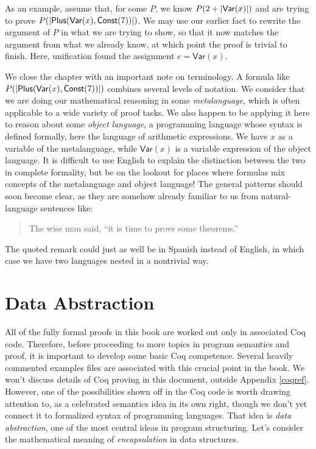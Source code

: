 \documentclass{amsbook}
\theoremstyle{definition}
\theoremstyle{remark}
\numberwithin{section}{chapter}
\numberwithin{equation}{chapter}
\begin{document}
As an example, assume that, for some $P$, we know $P(2 + {\left \lvert \mathsf{Var}(x) \right \rvert})$ and are trying to prove $P({\left \lvert \mathsf{Plus}(\mathsf{Var}(x), \mathsf{Const}(7)) \right \rvert})$.
We may use our earlier fact to rewrite the argument of $P$ in what we are trying to show, so that it now matches the argument from what we already know, at which point the proof is trivial to finish.
Here, unification found the assignment $e = \mathsf{Var}(x)$.

\medskip

\encoding
\label{metalanguage}
We close the chapter with an important note on terminology.
A formula like $P({\left \lvert \mathsf{Plus}(\mathsf{Var}(x), \mathsf{Const}(7)) \right \rvert})$ combines several levels of notation.
We consider that we are doing our mathematical reasoning in some \emph{metalanguage}, which is often applicable to a wide variety of proof tasks.
We also happen to be applying it here to reason about some \emph{object language}, a programming language whose syntax is defined formally, here the language of arithmetic expressions.
We have $x$ as a variable of the metalanguage, while $\mathsf{Var}(x)$ is a variable expression of the object language.
It is difficult to use English to explain the distinction between the two in complete formality, but be on the lookout for places where formulas mix concepts of the metalanguage and object language!
The general patterns should soon become clear, as they are somehow already familiar to us from natural-language sentences like:
\begin{quote}
  The wise man said, ``it is time to prove some theorems.''
\end{quote}
The quoted remark could just as well be in Spanish instead of English, in which case we have two languages nested in a nontrivial way.



\chapter{Data Abstraction}\label{adt}

All of the fully formal proofs in this book are worked out only in associated Coq code.
Therefore, before proceeding to more topics in program semantics and proof, it is important to develop some basic Coq competence.
Several heavily commented examples files are associated with this crucial point in the book.
We won't discuss details of Coq proving in this document, outside Appendix \ref{coqref}.
However, one of the possibilities shown off in the Coq code is worth drawing attention to, as a celebrated semantics idea in its own right, though we don't yet connect it to formalized syntax of programming languages.
That idea is \emph{data abstraction}, one of the most central ideas in program structuring.
Let's consider the mathematical meaning of \emph{encapsulation} in data structures.
\end{document}
